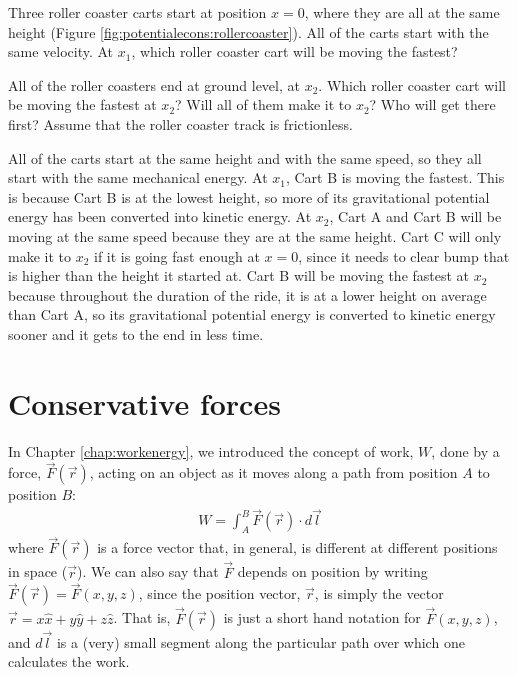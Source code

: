 \begin{opening}
Three roller coaster carts start at position $x=0$,  where they are all at the same height (Figure \ref{fig:potentialecons:rollercoaster}). All of the carts start with the same velocity. At $x_1$, which roller coaster cart will be moving the fastest? 

All of the roller coasters end at ground level, at $x_2$. Which roller coaster cart will be moving the fastest at $x_2$? Will all of them make it to $x_2$? Who will get there first?  Assume that the roller coaster track is frictionless.
\begin{answer}
All of the carts start at the same height and with the same speed, so they all start with the same mechanical energy. At $x_1$, Cart B is moving the fastest. This is because Cart B is at the lowest height, so more of its gravitational potential energy has been converted into kinetic energy. At $x_2$, Cart A and Cart B will be moving at the same speed because they are at the same height. Cart C will only make it to $x_2$ if it is going fast enough at $x=0$, since it needs to clear bump that is higher than the height it started at. Cart B will be moving the fastest at $x_2$ because throughout the duration of the ride, it is at a lower height on average than Cart A, so its gravitational potential energy is converted to kinetic energy sooner and it gets to the end in less time.   
\end{answer}
\end{opening}

\section{Conservative forces}
\label{sec:potentialecons:conservative}
In Chapter \ref{chap:workenergy}, we introduced the concept of work, $W$, done by a force, $\vec F(\vec r)$, acting on an object as it moves along a path from position $A$ to position $B$:
\begin{align}
\label{eq:potentialecons:workdef}
W = \int_A^B \vec F(\vec r) \cdot d\vec l
\end{align}
where $\vec F(\vec r)$ is a force vector that, in general, is different at different positions in space ($\vec r$). We can also say that $\vec F$ depends on position by writing $\vec F(\vec r)=\vec F(x,y,z)$, since the position vector, $\vec r$, is simply the vector $\vec r = x\hat x + y \hat y+ z\hat z$. That is, $\vec F(\vec r)$ is just a short	hand notation for $\vec F(x,y,z)$, and $d\vec l$ is a (very) small segment along the particular path over which one calculates the work.

